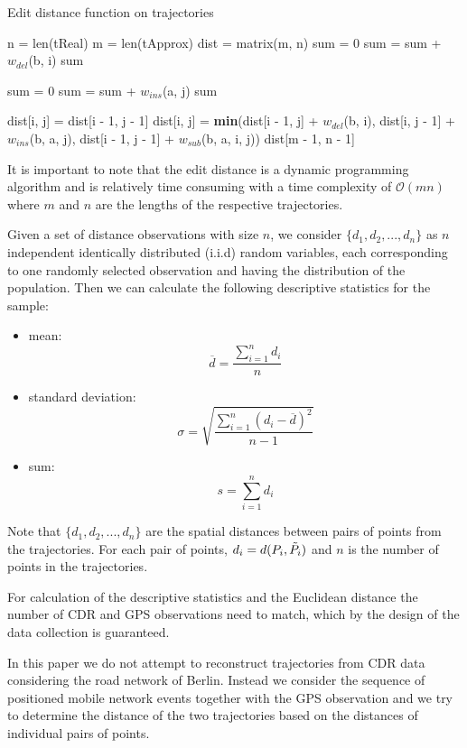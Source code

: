 \begin{algorithm}
\begin{algorithmic}
\caption{Edit distance function on trajectories} \label{algo:edit}
\State n = len(tReal)
\State m = len(tApprox) 
\State dist = matrix(m, n)
    \State sum = 0
        \State sum = sum + $w_{del}$(b, i)
    \EndFor
    \Return sum
\EndIf

    \State sum = 0
        \State sum = sum + $w_{ins}$(a, j)
    \EndFor
    \Return sum
\EndIf

                \State dist[i, j] = dist[i - 1, j - 1]
            \Else
                \State dist[i, j] = \textbf{min}(dist[i - 1, j] + $w_{del}$(b, i), dist[i, j - 1] + $w_{ins}$(b, a, j), dist[i - 1, j - 1] + $w_{sub}$(b, a, i, j))
            \EndIf
        \EndFor
    \EndFor
    \Return dist[m - 1, n - 1]
\EndIf
\EndFunction
\end{algorithmic}
\end{algorithm}

It is important to note that the edit distance is a dynamic programming algorithm and is relatively time consuming with a time complexity of $\mathcal{O}(mn)$ where $m$ and $n$ are the lengths of the respective trajectories.

Given a set of distance observations with size $n$, we consider $\{d_{1}, d_{2}, ..., d_{n}\}$ as $n$ independent identically distributed (i.i.d) random variables, each corresponding to one randomly selected observation and having the distribution of the population. Then we can calculate the following descriptive statistics for the sample:
\begin{itemize}
    \item mean:
     \[ \overline {d} = \frac{\sum_{i=1}^{n} d_{i}}{n}\]
     \item standard deviation:
    \[ \sigma={\sqrt {\frac {\sum _{i=1}^{n}(d_{i}-{\overline {d}})^{2}}{n-1}}}\]
    \item sum:        
    \[s = \sum_{i=1}^{n} d_{i}\]
\end{itemize}

Note that $\{d_{1}, d_{2}, ..., d_{n}\}$ are the spatial distances between pairs of points from the trajectories. For each pair of points, $d_{i} = d(P_{i},\Tilde{P_{i}})$ and $n$ is the number of points in the trajectories.

For calculation of the descriptive statistics and the Euclidean distance the number of CDR and GPS observations need to match, which by the design of the data collection is guaranteed.

In this paper we do not attempt to reconstruct trajectories from CDR data considering the road network of Berlin. Instead we consider the sequence of positioned mobile network events together with the GPS observation and we try to determine the distance of the two trajectories based on the distances of individual pairs of points.




